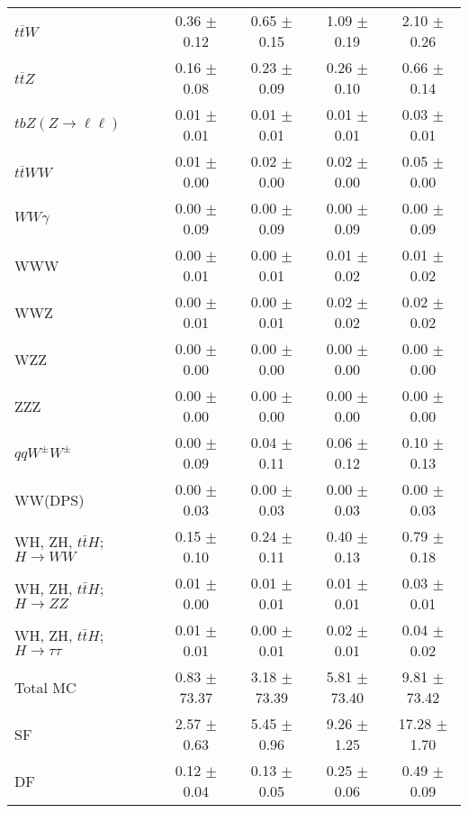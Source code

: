 \begin{tabular}{l|cccc}
                   $t\overline{t}W$ &  0.36 $\pm$  0.12 &  0.65 $\pm$  0.15 &  1.09 $\pm$  0.19 &  2.10 $\pm$  0.26 \\
                   $t\overline{t}Z$ &  0.16 $\pm$  0.08 &  0.23 $\pm$  0.09 &  0.26 $\pm$  0.10 &  0.66 $\pm$  0.14 \\
    $tbZ (Z \rightarrow \ell \ell)$ &  0.01 $\pm$  0.01 &  0.01 $\pm$  0.01 &  0.01 $\pm$  0.01 &  0.03 $\pm$  0.01 \\
                  $t\overline{t}WW$ &  0.01 $\pm$  0.00 &  0.02 $\pm$  0.00 &  0.02 $\pm$  0.00 &  0.05 $\pm$  0.00 \\
                         $WW\gamma$ &  0.00 $\pm$  0.09 &  0.00 $\pm$  0.09 &  0.00 $\pm$  0.09 &  0.00 $\pm$  0.09 \\
                                WWW &  0.00 $\pm$  0.01 &  0.00 $\pm$  0.01 &  0.01 $\pm$  0.02 &  0.01 $\pm$  0.02 \\
                                WWZ &  0.00 $\pm$  0.01 &  0.00 $\pm$  0.01 &  0.02 $\pm$  0.02 &  0.02 $\pm$  0.02 \\
                                WZZ &  0.00 $\pm$  0.00 &  0.00 $\pm$  0.00 &  0.00 $\pm$  0.00 &  0.00 $\pm$  0.00 \\
                                ZZZ &  0.00 $\pm$  0.00 &  0.00 $\pm$  0.00 &  0.00 $\pm$  0.00 &  0.00 $\pm$  0.00 \\
                 $qqW^{\pm}W^{\pm}$ &  0.00 $\pm$  0.09 &  0.04 $\pm$  0.11 &  0.06 $\pm$  0.12 &  0.10 $\pm$  0.13 \\
                            WW(DPS) &  0.00 $\pm$  0.03 &  0.00 $\pm$  0.03 &  0.00 $\pm$  0.03 &  0.00 $\pm$  0.03 \\
WH, ZH, $t\bar{t}H$; $H \rightarrow WW$ &  0.15 $\pm$  0.10 &  0.24 $\pm$  0.11 &  0.40 $\pm$  0.13 &  0.79 $\pm$  0.18 \\
WH, ZH, $t\bar{t}H$; $H \rightarrow ZZ$ &  0.01 $\pm$  0.00 &  0.01 $\pm$  0.01 &  0.01 $\pm$  0.01 &  0.03 $\pm$  0.01 \\
WH, ZH, $t\bar{t}H$; $H \rightarrow \tau\tau$ &  0.01 $\pm$  0.01 &  0.00 $\pm$  0.01 &  0.02 $\pm$  0.01 &  0.04 $\pm$  0.02 \\
\hline\hline
                           Total MC &  0.83 $\pm$ 73.37 &  3.18 $\pm$ 73.39 &  5.81 $\pm$ 73.40 &  9.81 $\pm$ 73.42 \\
\hline
                                 SF &  2.57 $\pm$  0.63 &  5.45 $\pm$  0.96 &  9.26 $\pm$  1.25 & 17.28 $\pm$  1.70 \\
                                 DF &  0.12 $\pm$  0.04 &  0.13 $\pm$  0.05 &  0.25 $\pm$  0.06 &  0.49 $\pm$  0.09 \\

\end{tabular}
